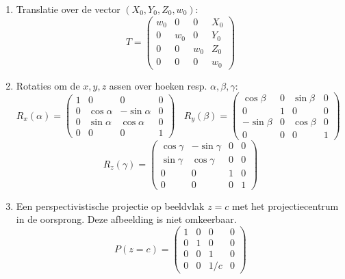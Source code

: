 \documentclass[twoside]{report}
\begin{document}
\begin{enumerate}
\item Translatie over de vector $(X_0, Y_0, Z_0, w_0)$:
\[
T=\left(\begin{array}{cccc}
w_0&0&0&X_0\\
0&w_0&0&Y_0\\
0&0&w_0&Z_0\\
0&0&0&w_0
\end{array}\right)
\]
\item Rotaties om de $x,y,z$ assen over hoeken resp. $\alpha,\beta,\gamma$:
\[
R_x(\alpha)=\left(\begin{array}{cccc}
1&0&0&0\\
0&\cos\alpha&-\sin\alpha&0\\
0&\sin\alpha&\cos\alpha&0\\
0&0&0&1
\end{array}\right)~~~~
R_y(\beta)=\left(\begin{array}{cccc}
\cos\beta&0&\sin\beta&0\\
0&1&0&0\\
-\sin\beta&0&\cos\beta&0\\
0&0&0&1
\end{array}\right)~~~~
\]
\[
R_z(\gamma)=\left(\begin{array}{cccc}
\cos\gamma&-\sin\gamma&0&0\\
\sin\gamma&\cos\gamma&0&0\\
0&0&1&0\\
0&0&0&1
\end{array}\right)
\]
\item Een perspectivistische projectie op beeldvlak $z=c$ met het
      projectiecentrum in de oorsprong. Deze afbeelding is niet omkeerbaar.
\[
P(z=c)=\left(\begin{array}{cccc}
1&0&0&0\\
0&1&0&0\\
0&0&1&0\\
0&0&1/c&0
\end{array}\right)
\]
\end{enumerate}
\end{document}
